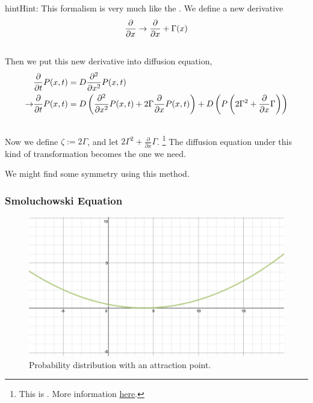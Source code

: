 \documentclass[letterpaper,10pt,english]{sphinxmanual}
\begin{document}
\begin{notice}{hint}{Hint:}
This formalism is very much like the . We define a new derivative
\begin{gather}
\begin{split}\frac{\partial}{\partial x} \to \frac{\partial}{\partial x} + \Gamma(x)\end{split}\notag\\\begin{split}\end{split}\notag
\end{gather}
Then we put this new derivative into diffusion equation,
\begin{gather}
\begin{split}& \frac{\partial}{\partial t} P(x,t) = D\frac{\partial^2}{\partial x^2} P(x,t) \\
\to & \frac{\partial}{\partial t} P(x,t) = D \left(\frac{\partial^2}{\partial x^2} P(x,t) + 2\Gamma\frac{\partial}{\partial x}P(x,t) \right) + D\left( P\left( 2\Gamma^2 + \frac{\partial}{\partial x} \Gamma \right) \right)\end{split}\notag\\\begin{split}\end{split}\notag
\end{gather}
Now we define $\zeta := 2\Gamma$, and let $2\Gamma^2 + \frac{\partial}{\partial x} \Gamma$. \footnote{
This is . More information \href{http://www.wolframalpha.com/input/?i=solve\%5Bdf\%2Fdx\%3D\%3D-2f\%5E2\%5D}{here}.
}  The diffusion equation under this kind of transformation becomes the one we need.


We might find some symmetry using this method.
\end{notice}


\subsubsection{Smoluchowski Equation}
\label{nonequilibrium/week12:smoluchowski-equation}\begin{figure}[htbp]
\centering
\capstart

\includegraphics[width=0.900\linewidth]{smoluchowski.png}
\caption{Probability distribution with an attraction point.}\end{figure}
\end{document}
